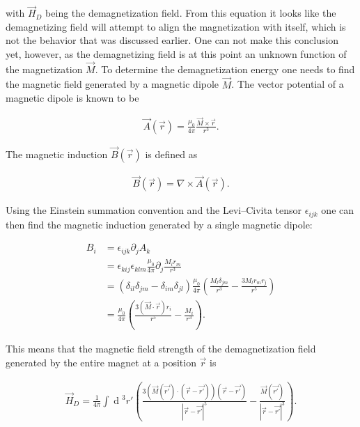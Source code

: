 \documentclass[1p]{elsarticle}		%
\renewcommand{\d}[1]{\ensuremath{\operatorname{d}\!{#1}}}
\begin{document}
with $\vec{H}_D$ being the demagnetization field. From this equation it looks like the demagnetizing field will attempt to align the magnetization with itself, which is not the behavior that was discussed earlier. One can not make this conclusion yet, however, as the demagnetizing field is at this point an unknown function of the magnetization $\vec{M}$. To determine the demagnetization energy one needs to find the magnetic field generated by a magnetic dipole $\vec{M}$. The vector potential of a magnetic dipole is known to be

\begin{align}
\vec{A}(\vec{r}) = \frac{\mu_0}{4\pi}\frac{\vec{M}\times\vec{r}}{r^3}.
\end{align} 

The magnetic induction $\vec{B}(\vec{r})$ is defined as

\begin{align}
\vec{B}(\vec{r}) = \nabla \times \vec{A}(\vec{r}).
\end{align}

Using the Einstein summation convention and the Levi--Civita tensor $\epsilon_{ijk}$ one can then find the magnetic induction generated by a single magnetic dipole:

\begin{align*}
B_i &= \epsilon_{ijk} \partial_j A_k \\
&= \epsilon_{kij}\epsilon_{klm} \frac{\mu_0}{4\pi}\partial_j\frac{M_l r_m}{r^3} \\
&= (\delta_{il}\delta_{jm}-\delta_{im}\delta_{jl})\frac{\mu_0}{4\pi}(\frac{M_l\delta_{jm}}{r^3}-\frac{3M_lr_mr_j}{r^5}) \\
&= \frac{\mu_0}{4\pi}(\frac{3(\vec{M}\cdot\vec{r})r_i}{r^5}-\frac{M_i}{r^3}).
\end{align*}

This means that the magnetic field strength of the demagnetization field generated by the entire magnet at a position $\vec{r}$ is

\begin{align}
\label{eq:demagfield}
\vec{H}_D = \frac{1}{4\pi} \int \d {^3}r' (\frac{3(\vec{M}(\vec{r'}) \cdot (\vec{r}-\vec{r'})) (\vec{r}-\vec{r'})}{|\vec{r}-\vec{r'}|^5}-\frac{\vec{M} (\vec{r'})}{|\vec{r}-\vec{r'}|^3}).
\end{align}
\end{document}
